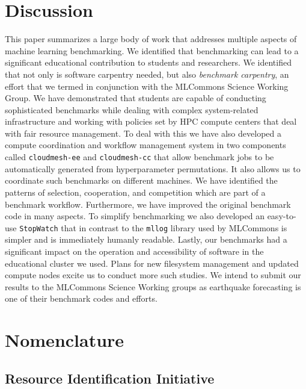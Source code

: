 \documentclass[utf8]{FrontiersinVancouver} %
\newcommand{\TODO}[2]{\todo[inline]{{\bf \color{red} #1} #2}}
\begin{document}
\section{Discussion}
\label{sec:conclusion}


This paper summarizes a large body of work that addresses multiple aspects of machine learning benchmarking. We identified that benchmarking can lead to a significant educational contribution to students and researchers. We identified that not only is software carpentry needed, but also {\em benchmark carpentry}, an effort that we termed in conjunction with the MLCommons Science Working Group. We have demonstrated that students are capable of conducting sophisticated benchmarks while dealing with complex system-related infrastructure and working with policies set by HPC compute centers that deal with fair resource management. To deal with this we have also developed a compute coordination and workflow management system in two components called \verb|cloudmesh-ee| and \verb|cloudmesh-cc| that allow benchmark jobs to be automatically generated from hyperparameter permutations. It also allows us to coordinate such benchmarks on different machines. We have identified the patterns of selection, cooperation, and competition which are part of a benchmark workflow. Furthermore, we have improved the original benchmark code in many aspects. To simplify benchmarking we also developed an easy-to-use \verb|StopWatch| that in contrast to the \verb|mllog| library used by MLCommons is simpler and is immediately humanly readable. Lastly, our benchmarks had a significant impact on the operation and accessibility of software in the educational cluster we used. Plans for new filesystem management and updated compute nodes excite us to conduct more such studies. We intend to submit our results to the MLCommons Science Working groups as earthquake forecasting is one of their benchmark codes and efforts.


\clearpage

\section{Nomenclature}

\subsection{Resource Identification Initiative}
\end{document}
